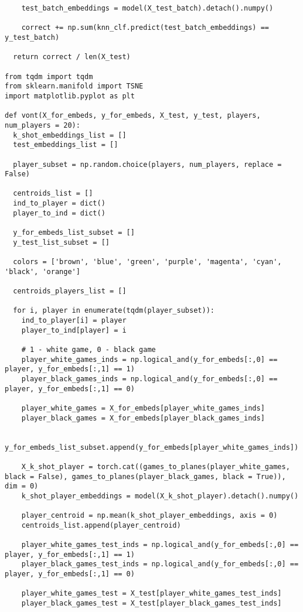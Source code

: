 \begin{verbatim}
    test_batch_embeddings = model(X_test_batch).detach().numpy()
    
    correct += np.sum(knn_clf.predict(test_batch_embeddings) == y_test_batch)

  return correct / len(X_test)

from tqdm import tqdm
from sklearn.manifold import TSNE
import matplotlib.pyplot as plt

def vont(X_for_embeds, y_for_embeds, X_test, y_test, players, num_players = 20):
  k_shot_embeddings_list = []
  test_embeddings_list = []

  player_subset = np.random.choice(players, num_players, replace = False)

  centroids_list = []
  ind_to_player = dict()
  player_to_ind = dict()

  y_for_embeds_list_subset = []
  y_test_list_subset = []

  colors = ['brown', 'blue', 'green', 'purple', 'magenta', 'cyan', 'black', 'orange']

  centroids_players_list = []

  for i, player in enumerate(tqdm(player_subset)):
    ind_to_player[i] = player
    player_to_ind[player] = i

    # 1 - white game, 0 - black game
    player_white_games_inds = np.logical_and(y_for_embeds[:,0] == player, y_for_embeds[:,1] == 1)
    player_black_games_inds = np.logical_and(y_for_embeds[:,0] == player, y_for_embeds[:,1] == 0)

    player_white_games = X_for_embeds[player_white_games_inds]
    player_black_games = X_for_embeds[player_black_games_inds]

    y_for_embeds_list_subset.append(y_for_embeds[player_white_games_inds])

    X_k_shot_player = torch.cat((games_to_planes(player_white_games, black = False), games_to_planes(player_black_games, black = True)), dim = 0)
    k_shot_player_embeddings = model(X_k_shot_player).detach().numpy()

    player_centroid = np.mean(k_shot_player_embeddings, axis = 0)
    centroids_list.append(player_centroid)

    player_white_games_test_inds = np.logical_and(y_for_embeds[:,0] == player, y_for_embeds[:,1] == 1)
    player_black_games_test_inds = np.logical_and(y_for_embeds[:,0] == player, y_for_embeds[:,1] == 0)

    player_white_games_test = X_test[player_white_games_test_inds]
    player_black_games_test = X_test[player_black_games_test_inds]


\end{verbatim}
